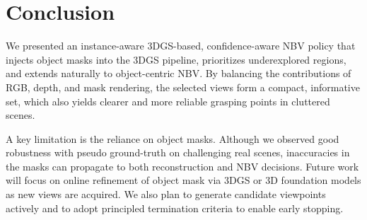 \section{Conclusion}
\label{sec:conclusion}

We presented an instance-aware \ac{3DGS}-based, confidence-aware \ac{NBV} policy that injects object masks into the \ac{3DGS} pipeline, prioritizes underexplored regions, and extends naturally to object-centric \ac{NBV}. By balancing the contributions of RGB, depth, and mask rendering, the selected views form a compact, informative set, which also yields clearer and more reliable grasping points in cluttered scenes.

A key limitation is the reliance on object masks. Although we observed good robustness with pseudo ground-truth on challenging real scenes, inaccuracies in the masks can propagate to both reconstruction and \ac{NBV} decisions. Future work will focus on online refinement of object mask via \ac{3DGS} or 3D foundation models as new views are acquired. We also plan to generate candidate viewpoints actively and to adopt principled termination criteria to enable early stopping.

